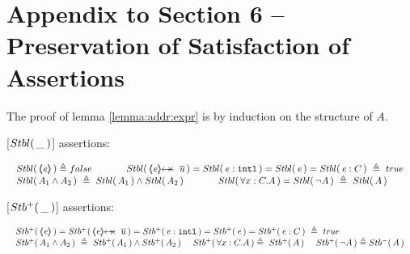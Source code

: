 \section{Appendix to Section 6 -- Preservation of Satisfaction of Assertions}
\label{app:preserve}

The proof of lemma \ref{lemma:addr:expr} is by induction on the structure of $A$.

\vspace{.2cm}

\begin{definition}
\label{def:Basic}
[${Stbl(\, \_\, )}$] assertions: %

$
\begin{array}{l}
 \begin{array}{lll}
  \Stable {\inside{\re}}  \triangleq  false & \lclSPACE &   \Stable {\protectedFrom \re {\overline {u}}} =  
  \Stable  {\internal \re} =  %
    \Stable {\re}=   
     \Stable {\re:C}\   \triangleq \    true
 \end{array}
  \\
 \begin{array}{lcl}
 \Stable  {A_1  \wedge  A_2}\  \triangleq\     \Stable  { A_1}  \wedge    \Stable  {A_2}    &
\lclSPACE  &  
 \Stable  {\forall x:C.A} =\Stable  {\neg A} \   \triangleq\   \Stable A
 \end{array}
 \end{array}
$
\label{f:Basic}
 \end{definition}


 \begin{definition}
[${Stb^+(\, \_\, )}$] assertions: %

$
\begin{array}{l}
 \begin{array}{l}
  \Pos {\inside{\re}} =  \Pos {\protectedFrom \re {\overline {u}}} =  
  \Pos  {\internal \re} =   
    \Pos {\re}=   
     \Pos {\re:C}\   \triangleq \    true
 \end{array}
  \\
 \begin{array}{lll}
 \Pos  {A_1  \wedge  A_2}\  \triangleq\     \Pos  { A_1}  \wedge    \Pos  {A_2}   \  &    
 \Pos  {\forall x:C.A}   \triangleq\   \Pos A
\   &
  \Pos {\neg A}  \triangleq \Neg A
 \end{array}
 \end{array}
 $
 \label{def:Pos}
\end{definition}

